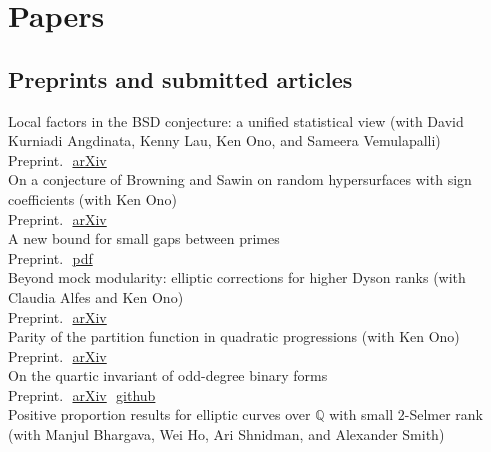 \documentclass[11pt]{article} %
\begin{document}

\section*{Papers}

\subsection*{Preprints and submitted articles}

 Local factors in the BSD conjecture: a unified statistical view (with David Kurniadi Angdinata, Kenny Lau, Ken Ono, and Sameera Vemulapalli)\\
Preprint.\,\, \textcolor[rgb]{0,0,1}{\href{https://arxiv.org/abs/2610.10243}{arXiv}} \\
 On a conjecture of Browning and Sawin on random hypersurfaces with sign coefficients (with Ken Ono)\\
Preprint.\,\, \textcolor[rgb]{0,0,1}{\href{https://arxiv.org/abs/2609.18879}{arXiv}} \\
 A new bound for small gaps between primes\\
Preprint.\,\, \textcolor[rgb]{0,0,1}{\href{https://primegaps.axiommath.ai/bgp212.pdf}{pdf}} \\
 Beyond mock modularity: elliptic corrections for higher Dyson ranks (with Claudia Alfes and Ken Ono)\\
Preprint.\,\, \textcolor[rgb]{0,0,1}{\href{https://arxiv.org/abs/2607.13159}{arXiv}} \\
 Parity of the partition function in quadratic progressions (with Ken Ono)\\
Preprint.\,\, \textcolor[rgb]{0,0,1}{\href{https://arxiv.org/abs/2509.09553}{arXiv}} \\
 On the quartic invariant of odd-degree binary forms\\
Preprint.\,\, \textcolor[rgb]{0,0,1}{\href{https://arxiv.org/abs/2603.24330}{arXiv}}\,\, \textcolor[rgb]{0,0,1}{\href{https://github.com/ashvin-swaminathan/quartic-invariant}{github}} \\
 Positive proportion results for elliptic curves over $\mathbb{Q}$ with small $2$-Selmer rank (with Manjul Bhargava, Wei Ho, Ari Shnidman, and Alexander Smith)\\
\end{document}
